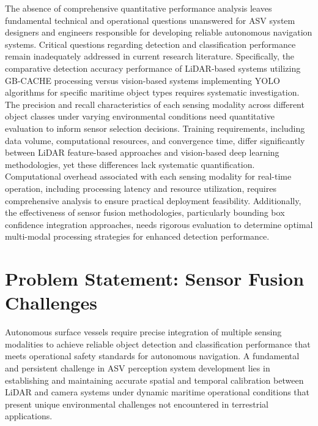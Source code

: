 \documentclass{erauthesis}
\begin{document}
The absence of comprehensive quantitative performance analysis leaves fundamental technical and operational questions unanswered for \ac{ASV} system designers and engineers responsible for developing reliable autonomous navigation systems. Critical questions regarding detection and classification performance remain inadequately addressed in current research literature. Specifically, the comparative detection accuracy performance of \ac{LiDAR}-based systems utilizing \ac{GB-CACHE} processing versus vision-based systems implementing \ac{YOLO} algorithms for specific maritime object types requires systematic investigation. The precision and recall characteristics of each sensing modality across different object classes under varying environmental conditions need quantitative evaluation to inform sensor selection decisions. Training requirements, including data volume, computational resources, and convergence time, differ significantly between \ac{LiDAR} feature-based approaches and vision-based deep learning methodologies, yet these differences lack systematic quantification. Computational overhead associated with each sensing modality for real-time operation, including processing latency and resource utilization, requires comprehensive analysis to ensure practical deployment feasibility. Additionally, the effectiveness of sensor fusion methodologies, particularly bounding box confidence integration approaches, needs rigorous evaluation to determine optimal multi-modal processing strategies for enhanced detection performance.

\section{Problem Statement: Sensor Fusion Challenges} \label{problem_statement2}

Autonomous surface vessels require precise integration of multiple sensing modalities to achieve reliable object detection and classification performance that meets operational safety standards for autonomous navigation. A fundamental and persistent challenge in \ac{ASV} perception system development lies in establishing and maintaining accurate spatial and temporal calibration between \ac{LiDAR} and camera systems under dynamic maritime operational conditions that present unique environmental challenges not encountered in terrestrial applications.
\end{document}

